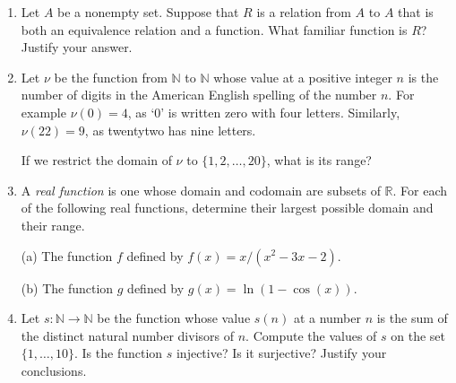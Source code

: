 \documentclass[12pt]{article}
\newcommand{\RR}{{\mathbb R}}  %
\newcommand{\NN}{{\mathbb N}}  %
\newcommand{\demph}[1]{{\color{blue}\sl{#1}}}
\begin{document}
\begin{enumerate}
  {\bf Proof:} Let $R$ be a symmetric and transitive relation on a nonempty set $A$.
  We need only to show that $R$ is reflexive.
  Let $x\in A$.
  Let $y\in A$ be such that $xRy$.
  As $R$ is symmetric, we have $yRx$.
  Now $xRy$ and $yRx$, so we conclude that $xRx$, by transitivity.
  Thus, $R$ is reflexive. \hfill $\Box$

  

\item  Let $A$ be a nonempty set.
  Suppose that $R$ is a relation from $A$ to $A$ that is both an equivalence relation and a function.
  What familiar function is $R$?
  Justify your answer.  

\item   Let $\nu$ be the function from $\NN$ to $\NN$ whose value at a positive integer $n$ is the number of digits in the American
  English spelling of the number $n$.
  For example $\nu(0)=4$, as `0' is written {\sf zero} with four letters.
  Similarly, $\nu(22)=9$, as {\sf twentytwo} has nine letters.

  If we restrict the domain of $\nu$ to $\{1,2,\dotsc,20\}$, what is its range?

\item A \demph{real function} is one whose domain and codomain are subsets of $\RR$.
  For each of the following real functions, determine their largest possible domain and their range.

  (a) The function $f$ defined by $f(x)=x/(x^2-3x-2)$.

  (b) The function $g$ defined by $g(x)=\ln(1-\cos(x))$.


\item  Let $s\colon\NN\to\NN$ be the function whose value $s(n)$ at a number $n$ is the sum of the distinct natural number divisors of
  $n$. 
  Compute the values of $s$ on the set $\{1,\dotsc,10\}$.
  Is the function $s$ injective?  Is it surjective?  Justify your conclusions.




\end{enumerate}
\end{document}
